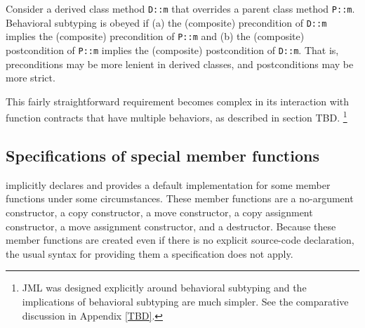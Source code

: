 Consider a derived class method \lstinline|D::m| that overrides a parent class method \lstinline|P::m|.
Behavioral subtyping is obeyed if (a) the (composite) precondition of
\lstinline|D::m| implies the (composite) precondition of 
\lstinline|P::m| and (b) the (composite) postcondition of
\lstinline|P::m| implies the (composite) postcondition of 
\lstinline|D::m|. That is, preconditions may be more lenient in derived classes, and postconditions may be more strict. 

This fairly straightforward requirement becomes complex in its interaction with function contracts that have multiple behaviors, 
as described in section TBD.
\footnote{JML was designed explicitly around behavioral subtyping and the implications of behavioral subtyping are much simpler. 
	See the comparative discussion in Appendix \ref{TBD}.}


\subsection{Specifications of special member functions}

\lang{} implicitly declares and provides a default implementation for some member functions under some circumstances. These member functions are a no-argument constructor, a copy constructor, a move constructor, a copy assignment constructor, a move assignment constructor, and a destructor. Because these member functions are created even if
there is no explicit source-code declaration, the usual syntax for providing them
a specification does not apply.
